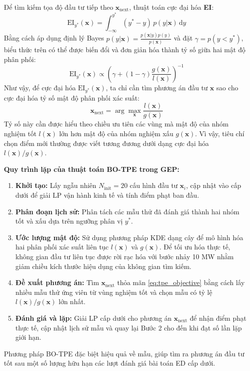 Để tìm kiếm tọa độ đầu tư tiếp theo $\mathbf{x}_{\text{next}}$, thuật toán cực đại hóa \textbf{EI}:
\begin{equation}
    \text{EI}_{y^*}(\mathbf{x}) = \int_{-\infty}^{y^*} (y^* - y) \, p(y|\mathbf{x}) \, \text{d}y
\end{equation}
Bằng cách áp dụng định lý Bayes $p(y|\mathbf{x}) = \frac{p(\mathbf{x}|y)p(y)}{p(\mathbf{x})}$ và đặt $\gamma = p(y < y^*)$, biểu thức trên có thể được biến đổi và đơn giản hóa thành tỷ số giữa hai mật độ phân phối:
\begin{equation}
    \text{EI}_{y^*}(\mathbf{x}) \propto \left( \gamma + (1-\gamma) \frac{g(\mathbf{x})}{l(\mathbf{x})} \right)^{-1}
\end{equation}
Như vậy, để cực đại hóa $\text{EI}_{y^*}(\mathbf{x})$, ta chỉ cần tìm phương án đầu tư $\mathbf{x}$ sao cho cực đại hóa tỷ số mật độ phân phối xác suất:
\begin{equation}
    \mathbf{x}_{\text{next}} = \arg\max_{\mathbf{x}} \frac{l(\mathbf{x})}{g(\mathbf{x})}
    \label{eq:tpe_objective}
\end{equation}
Tỷ số này cần được hiểu theo chiều ưu tiên các vùng mà mật độ của nhóm nghiệm tốt $l(\mathbf{x})$ lớn hơn mật độ của nhóm nghiệm xấu $g(\mathbf{x})$. Vì vậy, tiêu chí chọn điểm mới thường được viết tương đương dưới dạng cực đại hóa $l(\mathbf{x})/g(\mathbf{x})$.

\textbf{Quy trình lặp của thuật toán BO-TPE trong GEP:}
\begin{enumerate}
    \item \textbf{Khởi tạo:} Lấy ngẫu nhiên $N_{\text{init}} = 20$ cấu hình đầu tư $\mathbf{x}_i$, cập nhật vào cấp dưới để giải LP vận hành kinh tế và tính điểm phạt ban đầu.
    \item \textbf{Phân đoạn lịch sử:} Phân tách các mẫu thử đã đánh giá thành hai nhóm tốt và xấu dựa trên ngưỡng phân vị $y^*$.
    \item \textbf{Ước lượng mật độ:} Sử dụng phương pháp KDE dạng cây để mô hình hóa hai phân phối xác suất liên tục $l(\mathbf{x})$ và $g(\mathbf{x})$. Để tối ưu hóa thực tế, không gian đầu tư liên tục được rời rạc hóa với bước nhảy 10 MW nhằm giảm chiều kích thước hiệu dụng của không gian tìm kiếm.
    \item \textbf{Đề xuất phương án:} Tìm $\mathbf{x}_{\text{next}}$ thỏa mãn \eqref{eq:tpe_objective} bằng cách lấy nhiều mẫu thử ứng viên từ vùng nghiệm tốt và chọn mẫu có tỷ lệ $l(\mathbf{x})/g(\mathbf{x})$ lớn nhất.
    \item \textbf{Đánh giá và lặp:} Giải LP cấp dưới cho phương án $\mathbf{x}_{\text{next}}$ để nhận điểm phạt thực tế, cập nhật lịch sử mẫu và quay lại Bước 2 cho đến khi đạt số lần lặp giới hạn.
\end{enumerate}
Phương pháp BO-TPE đặc biệt hiệu quả về mẫu, giúp tìm ra phương án đầu tư tốt sau một số lượng hữu hạn các lượt đánh giá bài toán ED cấp dưới.

